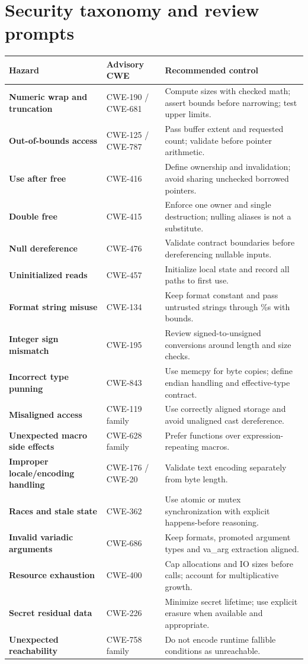 \documentclass[10pt,letterpaper,oneside]{report}
\begin{document}
\chapter{Security taxonomy and review prompts}
\small\begin{longtable}{>{\raggedright\arraybackslash}p{.24\linewidth}>{\raggedright\arraybackslash}p{.22\linewidth}>{\raggedright\arraybackslash}p{.45\linewidth}}\toprule Hazard & Advisory CWE & Recommended control\\\midrule\endhead
\textbf{Numeric wrap and truncation} & CWE-190 / CWE-681 & Compute sizes with checked math; assert bounds before narrowing; test upper limits.\\\hline
\textbf{Out-of-bounds access} & CWE-125 / CWE-787 & Pass buffer extent and requested count; validate before pointer arithmetic.\\\hline
\textbf{Use after free} & CWE-416 & Define ownership and invalidation; avoid sharing unchecked borrowed pointers.\\\hline
\textbf{Double free} & CWE-415 & Enforce one owner and single destruction; nulling aliases is not a substitute.\\\hline
\textbf{Null dereference} & CWE-476 & Validate contract boundaries before dereferencing nullable inputs.\\\hline
\textbf{Uninitialized reads} & CWE-457 & Initialize local state and record all paths to first use.\\\hline
\textbf{Format string misuse} & CWE-134 & Keep format constant and pass untrusted strings through \%s with bounds.\\\hline
\textbf{Integer sign mismatch} & CWE-195 & Review signed-to-unsigned conversions around length and size checks.\\\hline
\textbf{Incorrect type punning} & CWE-843 & Use memcpy for byte copies; define endian handling and effective-type contract.\\\hline
\textbf{Misaligned access} & CWE-119 family & Use correctly aligned storage and avoid unaligned cast dereference.\\\hline
\textbf{Unexpected macro side effects} & CWE-628 family & Prefer functions over expression-repeating macros.\\\hline
\textbf{Improper locale/encoding handling} & CWE-176 / CWE-20 & Validate text encoding separately from byte length.\\\hline
\textbf{Races and stale state} & CWE-362 & Use atomic or mutex synchronization with explicit happens-before reasoning.\\\hline
\textbf{Invalid variadic arguments} & CWE-686 & Keep formats, promoted argument types and va\_arg extraction aligned.\\\hline
\textbf{Resource exhaustion} & CWE-400 & Cap allocations and IO sizes before calls; account for multiplicative growth.\\\hline
\textbf{Secret residual data} & CWE-226 & Minimize secret lifetime; use explicit erasure when available and appropriate.\\\hline
\textbf{Unexpected reachability} & CWE-758 family & Do not encode runtime fallible conditions as unreachable.\\\hline
\bottomrule\end{longtable}\normalsize
\end{document}
